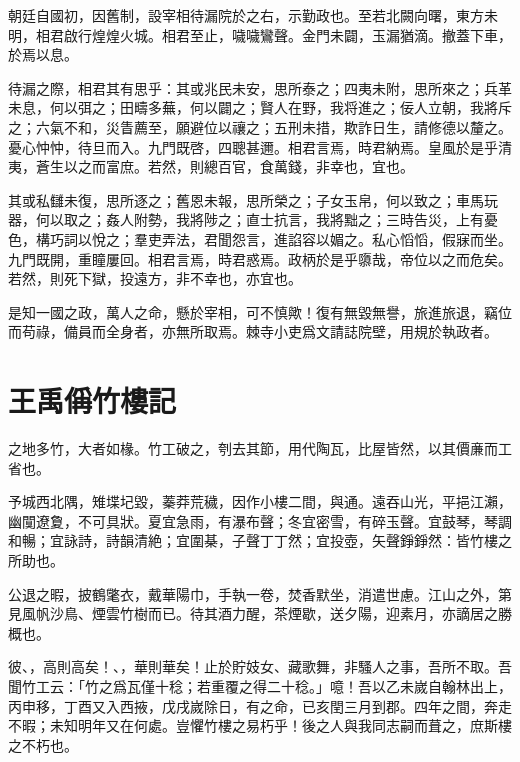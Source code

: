 朝廷自國初，因舊制，設宰相待漏院於之右，示勤政也。至若北闕向曙，東方未明，相君啟行煌煌火城。相君至止，噦噦鸞聲。金門未闢，玉漏猶滴。撤蓋下車，於焉以息。

待漏之際，相君其有思乎：其或兆民未安，思所泰之；四夷未附，思所來之；兵革未息，何以弭之；田疇多蕪，何以闢之；賢人在野，我将進之；佞人立朝，我將斥之；六氣不和，災眚薦至，願避位以禳之；五刑未措，欺詐日生，請修德以釐之。憂心忡忡，待旦而入。九門既啓，四聰甚邇。相君言焉，時君納焉。皇風於是乎清夷，蒼生以之而富庶。若然，則總百官，食萬錢，非幸也，宜也。

其或私讎未復，思所逐之；舊恩未報，思所榮之；子女玉帛，何以致之；車馬{玩器}，何以取之；姦人附勢，我將陟之；直士抗言，我將黜之；三時告災，上有憂色，構巧詞以悅之；羣吏弄法，君聞怨言，進諂容以媚之。私心慆慆，假寐而坐。九門既開，重瞳屢回。相君言焉，時君惑焉。政柄於是乎隳哉，帝位以之而危矣。若然，則死下獄，投遠方，非不幸也，亦宜也。%

是知一國之政，萬人之命，懸於宰相，可不慎歟！復有無毀無譽，旅進旅退，竊位而苟祿，備員而全身者，亦無所取焉。棘寺小吏爲文請誌院壁，用規於執政者。

\section[黃岡竹樓記\quad{\small 王禹偁}]{{\normalsize 王禹偁}\quad {}竹樓記}
之地多竹，大者如椽。竹工破之，刳去其節，用代陶瓦，比屋皆然，以其價亷而工省也。

予城西北隅，雉堞圮毀，蓁莽荒穢，因作小樓二間，與通。遠吞山光，平挹江瀨，幽闃遼夐，不可具狀。夏宜急雨，有瀑布聲；冬宜密雪，有碎玉聲。宜鼓琴，琴調和暢；宜詠詩，詩韻清絶；宜圍棊，子聲丁丁然；宜投壺，矢聲錚錚然：皆竹樓之所助也。

公退之暇，披鶴氅衣，戴華陽巾，手執一卷，焚香默坐，消遣世慮。江山之外，第見風帆沙鳥、煙雲竹樹而已。待其酒力醒，茶煙歇，送夕陽，迎素月，亦謫居之勝概也。

彼、，高則高矣！、，華則華矣！止於貯妓女、藏歌舞，非騷人之事，吾所不取。吾聞竹工云：「竹之爲瓦僅十稔；若重覆之得二十稔。」噫！吾以乙未嵗自翰林出上，丙申移，丁酉又入西掖，戊戌嵗除日，有之命，已亥閏三月到郡。四年之間，奔走不暇；未知明年又在何處。豈懼竹樓之易朽乎！後之人與我同志嗣而葺之，庶斯樓之不朽也。%

